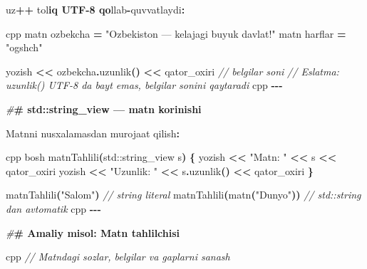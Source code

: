 \documentclass[a4paper,11pt,twoside,openright]{book}
\newenvironment{Shaded}{\begin{snugshade}}{\end{snugshade}}
\newcommand{\BuiltInTok}[1]{#1}
\newcommand{\CharTok}[1]{\textcolor[rgb]{0.31,0.60,0.02}{#1}}
\newcommand{\CommentTok}[1]{\textcolor[rgb]{0.56,0.35,0.01}{\textit{#1}}}
\newcommand{\ErrorTok}[1]{\textcolor[rgb]{0.64,0.00,0.00}{\textbf{#1}}}
\newcommand{\NormalTok}[1]{#1}
\newcommand{\OperatorTok}[1]{\textcolor[rgb]{0.81,0.36,0.00}{\textbf{#1}}}
\newcommand{\PreprocessorTok}[1]{\textcolor[rgb]{0.56,0.35,0.01}{\textit{#1}}}
\newcommand{\StringTok}[1]{\textcolor[rgb]{0.31,0.60,0.02}{#1}}
\begin{document}
\begin{Shaded}
\begin{Highlighting}[]
\NormalTok{uz}\OperatorTok{++}\NormalTok{ to}\CharTok{\textquotesingle{}l}\ErrorTok{iq UTF{-}8 qo}\CharTok{\textquotesingle{}}\NormalTok{llab}\OperatorTok{{-}}\NormalTok{quvvatlaydi}\OperatorTok{:}

\ErrorTok{\textasciigrave{}\textasciigrave{}\textasciigrave{}}\NormalTok{cpp}
\NormalTok{matn ozbekcha }\OperatorTok{=} \StringTok{"O\textquotesingle{}zbekiston — kelajagi buyuk davlat!"}
\NormalTok{matn harflar }\OperatorTok{=} \StringTok{"o\textquotesingle{}g\textquotesingle{}shch\textquotesingle{}"}

\NormalTok{yozish }\OperatorTok{\textless{}\textless{}}\NormalTok{ ozbekcha}\OperatorTok{.}\NormalTok{uzunlik}\OperatorTok{()} \OperatorTok{\textless{}\textless{}}\NormalTok{ qator\_oxiri   }\CommentTok{// belgilar soni}
\CommentTok{// Eslatma: uzunlik() UTF{-}8 da bayt emas, belgilar sonini qaytaradi}
\ErrorTok{\textasciigrave{}\textasciigrave{}\textasciigrave{}}\NormalTok{cpp}
\OperatorTok{{-}{-}{-}}

\PreprocessorTok{\#}\ErrorTok{\# \textasciigrave{}std::string\_view\textasciigrave{} — matn ko\textquotesingle{}rinishi}

\NormalTok{Matnni nusxalamasdan murojaat qilish}\OperatorTok{:}

\ErrorTok{\textasciigrave{}\textasciigrave{}\textasciigrave{}}\NormalTok{cpp}
\NormalTok{bosh matnTahlili}\OperatorTok{(}\BuiltInTok{std::}\NormalTok{string\_view s}\OperatorTok{)} \OperatorTok{\{}
\NormalTok{    yozish }\OperatorTok{\textless{}\textless{}} \StringTok{"Matn: "} \OperatorTok{\textless{}\textless{}}\NormalTok{ s }\OperatorTok{\textless{}\textless{}}\NormalTok{ qator\_oxiri}
\NormalTok{    yozish }\OperatorTok{\textless{}\textless{}} \StringTok{"Uzunlik: "} \OperatorTok{\textless{}\textless{}}\NormalTok{ s}\OperatorTok{.}\NormalTok{uzunlik}\OperatorTok{()} \OperatorTok{\textless{}\textless{}}\NormalTok{ qator\_oxiri}
\OperatorTok{\}}

\NormalTok{matnTahlili}\OperatorTok{(}\StringTok{"Salom"}\OperatorTok{)}           \CommentTok{// string literal}
\NormalTok{matnTahlili}\OperatorTok{(}\NormalTok{matn}\OperatorTok{(}\StringTok{"Dunyo"}\OperatorTok{))}     \CommentTok{// std::string dan avtomatik}
\ErrorTok{\textasciigrave{}\textasciigrave{}\textasciigrave{}}\NormalTok{cpp}
\OperatorTok{{-}{-}{-}}

\PreprocessorTok{\#}\ErrorTok{\# Amaliy misol: Matn tahlilchisi}

\ErrorTok{\textasciigrave{}\textasciigrave{}\textasciigrave{}}\NormalTok{cpp}
\CommentTok{// Matndagi so\textquotesingle{}zlar, belgilar va gaplarni sanash}


\end{Highlighting}
\end{Shaded}
\end{document}
